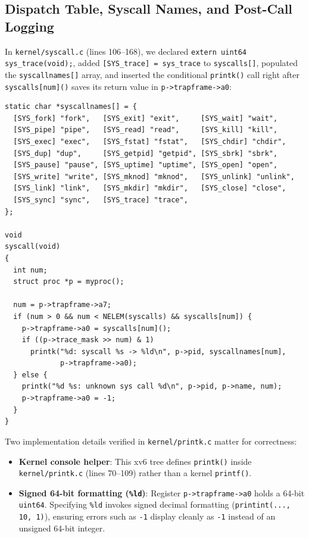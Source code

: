 \documentclass[12pt,a4paper]{article}
\begin{document}
\subsection{Dispatch Table, Syscall Names, and Post-Call Logging}
In \texttt{kernel/syscall.c} (lines 106--168), we declared \texttt{extern uint64 sys\_trace(void);}, added \texttt{[SYS\_trace] = sys\_trace} to \texttt{syscalls[]}, populated the \texttt{syscallnames[]} array, and inserted the conditional \texttt{printk()} call right after \texttt{syscalls[num]()} saves its return value in \texttt{p->trapframe->a0}:

\begin{lstlisting}[style=cstyle,caption={Syscall name table and dispatch logging in \texttt{kernel/syscall.c}}]
static char *syscallnames[] = {
  [SYS_fork] "fork",   [SYS_exit] "exit",     [SYS_wait] "wait",
  [SYS_pipe] "pipe",   [SYS_read] "read",     [SYS_kill] "kill",
  [SYS_exec] "exec",   [SYS_fstat] "fstat",   [SYS_chdir] "chdir",
  [SYS_dup] "dup",     [SYS_getpid] "getpid", [SYS_sbrk] "sbrk",
  [SYS_pause] "pause", [SYS_uptime] "uptime", [SYS_open] "open",
  [SYS_write] "write", [SYS_mknod] "mknod",   [SYS_unlink] "unlink",
  [SYS_link] "link",   [SYS_mkdir] "mkdir",   [SYS_close] "close",
  [SYS_sync] "sync",   [SYS_trace] "trace",
};

void
syscall(void)
{
  int num;
  struct proc *p = myproc();

  num = p->trapframe->a7;
  if (num > 0 && num < NELEM(syscalls) && syscalls[num]) {
    p->trapframe->a0 = syscalls[num]();
    if ((p->trace_mask >> num) & 1)
      printk("%d: syscall %s -> %ld\n", p->pid, syscallnames[num],
             p->trapframe->a0);
  } else {
    printk("%d %s: unknown sys call %d\n", p->pid, p->name, num);
    p->trapframe->a0 = -1;
  }
}
\end{lstlisting}

Two implementation details verified in \texttt{kernel/printk.c} matter for correctness:
\begin{itemize}
    \item \textbf{Kernel console helper}: This xv6 tree defines \texttt{printk()} inside \texttt{kernel/printk.c} (lines 70--109) rather than a kernel \texttt{printf()}.
    \item \textbf{Signed 64-bit formatting (\texttt{\%ld})}: Register \texttt{p->trapframe->a0} holds a 64-bit \texttt{uint64}. Specifying \texttt{\%ld} invokes signed decimal formatting (\texttt{printint(..., 10, 1)}), ensuring errors such as \texttt{-1} display cleanly as \texttt{-1} instead of an unsigned 64-bit integer.
\end{itemize}
\end{document}
